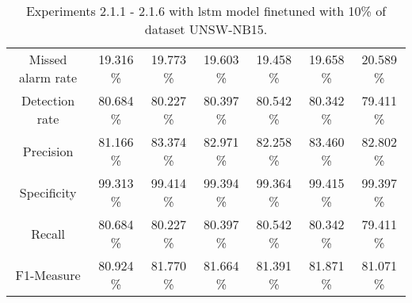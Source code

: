 \begin{table}[htb]
\begin{tabular}{@{}ccccccc@{}}
        Missed alarm rate &  19.316 \% &  19.773 \% &  19.603 \% &  19.458 \% &  19.658 \% &  20.589 \% \\
        Detection rate &  80.684 \% &  80.227 \% &  80.397 \% &  80.542 \% &  80.342 \% &  79.411 \% \\
        Precision &  81.166 \% &  83.374 \% &  82.971 \% &  82.258 \% &  83.460 \% &  82.802 \% \\
        Specificity &  99.313 \% &  99.414 \% &  99.394 \% &  99.364 \% &  99.415 \% &  99.397 \% \\
        Recall &  80.684 \% &  80.227 \% &  80.397 \% &  80.542 \% &  80.342 \% &  79.411 \% \\
        F1-Measure &  80.924 \% &  81.770 \% &  81.664 \% &  81.391 \% &  81.871 \% &  81.071 \% \\
        \bottomrule
    \end{tabular}
    \caption{Experiments 2.1.1 - 2.1.6 with \gls{lstm} model finetuned with 10\% of dataset UNSW-NB15.}
    \label{table:results:lstm:flows15_10}
\end{table}